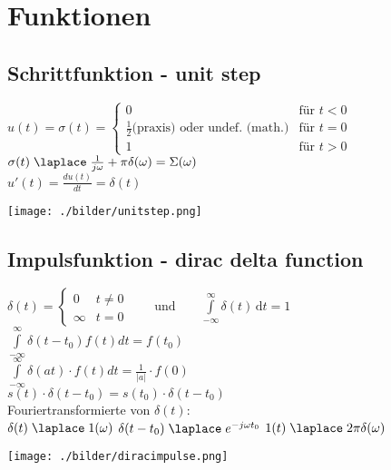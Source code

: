 

\section{Funktionen}
	\subsection{Schrittfunktion - unit step}
		\begin{minipage}{10cm}
			$u(t) = \sigma(t) =	\begin{cases}
						 0 & \text{f\"ur } t < 0 \\
						 \frac{1}{2} \text{(praxis)}  \text{ oder undef. (math.)} & \text{f\"ur } t = 0 \\
						 1 & \text{f\"ur } t > 0
					\end{cases}
			$
			$\sigma(t) \; \laplace \; \frac{1}{j\omega} + \pi\delta(\omega) = \Sigma(\omega)$ \\
			$ u'(t) = \frac{du(t)}{dt}=\delta(t)$
		\end{minipage}
		\begin{minipage}{8cm}
			\texttt{[image: ./bilder/unitstep.png]}
		\end{minipage}

	\subsection{Impulsfunktion - dirac delta function}
		\begin{minipage}{10cm}
			$\delta (t)=\begin{cases} 0 & t\ne 0\\\infty & t=0\end{cases} \qquad
			\text{und} \qquad \int\limits_{-\infty}^\infty \delta(t) \, \mathrm dt = 1 $\\
			$\int\limits_{-\infty}^{\infty}\delta(t-t_0)f(t)dt=f(t_0)$\\
			$\int\limits_{-\infty}^{\infty}\delta(at)\cdot f(t) dt = \frac{1}{|a|} \cdot f(0)$\\
			$s(t) \cdot \delta(t-t_0) = s(t_0)\cdot \delta(t-t_0)$\\
			Fouriertransformierte von $\delta(t)$:\\
			$\delta(t) \; \laplace \; 1(\omega)$ \hspace{0.5cm}
			$\delta(t-t_0) \; \laplace \; e^{-j\omega t_0}$ \hspace{0.5cm}
			$1(t) \; \laplace \; 2\pi \delta(\omega)$
		\end{minipage}
		\begin{minipage}{8cm}
			\texttt{[image: ./bilder/diracimpulse.png]}
		\end{minipage}
		
